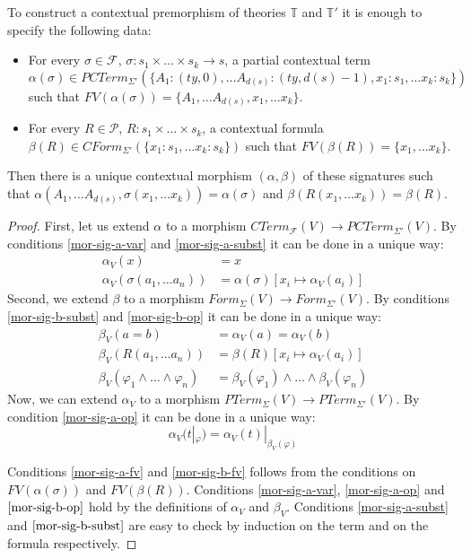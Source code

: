 \documentclass[reqno]{amsart}
\theoremstyle{definition}
\theoremstyle{remark}
\numberwithin{figure}{section}
\begin{document}
\begin{prop}
To construct a contextual premorphism of theories $\mathbb{T}$ and $\mathbb{T}'$ it is enough to specify the following data:
\begin{itemize}
\item For every $\sigma \in \mathcal{F}$, $\sigma : s_1 \times \ldots \times s_k \to s$,
    a partial contextual term $\alpha(\sigma) \in PCTerm_{\Sigma'}(\{ A_1 : (ty,0), \ldots A_{d(s)} : (ty,d(s)-1), x_1 : s_1, \ldots x_k : s_k \})$
    such that $FV(\alpha(\sigma)) = \{ A_1, \ldots A_{d(s)}, x_1, \ldots x_k \}$.
\item For every $R \in \mathcal{P}$, $R : s_1 \times \ldots \times s_k$,
    a contextual formula $\beta(R) \in CForm_{\Sigma'}(\{ x_1 : s_1, \ldots x_k : s_k \})$ such that $FV(\beta(R)) = \{ x_1, \ldots x_k \}$.
\end{itemize}
Then there is a unique contextual morphism $(\alpha,\beta)$ of these signatures such that
$\alpha(A_1, \ldots A_{d(s)}, \sigma(x_1, \ldots x_k)) = \alpha(\sigma)$ and $\beta(R(x_1, \ldots x_k)) = \beta(R)$.
\end{prop}
\begin{proof}
First, let us extend $\alpha$ to a morphism $CTerm_\mathcal{F}(V) \to PCTerm_{\Sigma'}(V)$.
By conditions \eqref{mor-sig-a-var} and \eqref{mor-sig-a-subst} it can be done in a unique way:
\begin{align*}
\alpha_V(x) & = x \\
\alpha_V(\sigma(a_1, \ldots a_n)) & = \alpha(\sigma)[x_i \mapsto \alpha_V(a_i)]
\end{align*}
Second, we extend $\beta$ to a morphism $Form_\Sigma(V) \to Form_{\Sigma'}(V)$.
By conditions \eqref{mor-sig-b-subst} and \eqref{mor-sig-b-op} it can be done in a unique way:
\begin{align*}
\beta_V(a = b) & = \alpha_V(a) = \alpha_V(b) \\
\beta_V(R(a_1, \ldots a_n)) & = \beta(R)[x_i \mapsto \alpha_V(a_i)] \\
\beta_V(\varphi_1 \land \ldots \land \varphi_n) & = \beta_V(\varphi_1) \land \ldots \land \beta_V(\varphi_n)
\end{align*}
Now, we can extend $\alpha_V$ to a morphism $PTerm_\Sigma(V) \to PTerm_{\Sigma'}(V)$.
By condition \eqref{mor-sig-a-op} it can be done in a unique way:
\[ \alpha_V(t|_\varphi) = \alpha_V(t)|_{\beta_V(\varphi)} \]

Conditions \eqref{mor-sig-a-fv} and \eqref{mor-sig-b-fv} follows from the conditions on $FV(\alpha(\sigma))$ and $FV(\beta(R))$.
Conditions \eqref{mor-sig-a-var}, \eqref{mor-sig-a-op} and $\eqref{mor-sig-b-op}$ hold by the definitions of $\alpha_V$ and $\beta_V$.
Conditions \eqref{mor-sig-a-subst} and $\eqref{mor-sig-b-subst}$ are easy to check by induction on the term and on the formula respectively.
\end{proof}
\end{document}
